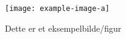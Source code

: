 \begin{figure}[h]
    \centering
    \texttt{[image: example-image-a]}
    \caption{Dette er et eksempelbilde/figur}
    \label{fig:yes}
\end{figure}
